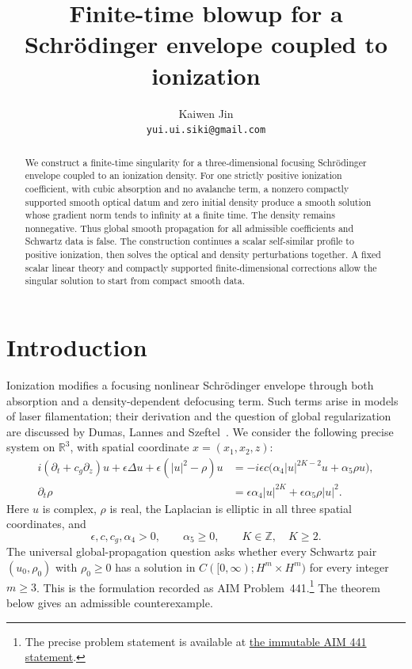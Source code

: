 \documentclass[11pt]{article}
\title{Finite-time blowup for a Schr\"odinger envelope coupled to ionization}
\author{Kaiwen Jin\\\small\texttt{yui.ui.siki@gmail.com}}
\date{}
\numberwithin{equation}{section}
\theoremstyle{remark}
\newcommand{\R}{\mathbb R}
\newcommand{\eps}{\epsilon}
\begin{document}
\maketitle
\begin{abstract}
We construct a finite-time singularity for a three-dimensional focusing
Schr\"odinger envelope coupled to an ionization density. For one strictly
positive ionization coefficient, with cubic absorption and no avalanche
term, a nonzero compactly supported smooth optical datum and zero initial
density produce a smooth solution whose gradient norm tends to infinity
at a finite time. The density remains nonnegative. Thus global smooth
propagation for all admissible coefficients and Schwartz data is false.
The construction continues a scalar self-similar profile to positive
ionization, then solves the optical and density perturbations together.
A fixed scalar linear theory and compactly supported finite-dimensional
corrections allow the singular solution to start from compact smooth data.
\end{abstract}

\section{Introduction}\label{sec:introduction}

Ionization modifies a focusing nonlinear Schr\"odinger envelope through
both absorption and a density-dependent defocusing term. Such terms arise
in models of laser filamentation; their derivation and the question of
global regularization are discussed by Dumas, Lannes and
Szeftel~\cite[Section 4.1.2, equation (54) and Open Problem 3]{DLS}.
We consider the following precise system on $\R^3$, with spatial
coordinate $x=(x_1,x_2,z)$:
\begin{equation}\label{eq:original}
 \begin{split}
 i(\partial_t+c_g\partial_z)u+\eps\Delta u
          +\eps(|u|^2-\rho)u
   &=-i\eps c\bigl(\alpha_4|u|^{2K-2}u+\alpha_5\rho u\bigr),\\
 \partial_t\rho&=\eps\alpha_4|u|^{2K}
                       +\eps\alpha_5\rho|u|^2.
 \end{split}
\end{equation}
Here $u$ is complex, $\rho$ is real, the Laplacian is elliptic in all
three spatial coordinates, and
\[
 \eps,c,c_g,\alpha_4>0,\qquad \alpha_5\ge0,
 \qquad K\in\mathbb Z,\quad K\ge2.
\]
The universal global-propagation question asks whether every Schwartz
pair $(u_0,\rho_0)$ with $\rho_0\ge0$ has a solution in
$C([0,\infty);H^m\times H^m)$ for every integer $m\ge3$.
This is the formulation recorded as AIM Problem~441.\footnote{The
precise problem statement is available at
\href{https://github.com/MColbrook/AIM/blob/a153f469ee0ea64e876b2ad97c79d252c19a3e22/problems/441-ionization-laser-envelope-global-regularity.md}{the immutable AIM 441 statement}.}
The theorem below gives an admissible counterexample.
\end{document}
